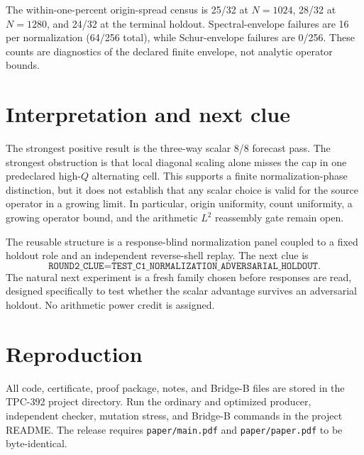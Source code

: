 \documentclass[10pt]{article}
\begin{document}
The within-one-percent origin-spread census is 25/32 at $N=1024$, 28/32 at
$N=1280$, and 24/32 at the terminal holdout.  Spectral-envelope failures are
16 per normalization (64/256 total), while Schur-envelope failures are 0/256.
These counts are diagnostics of the declared finite envelope, not analytic
operator bounds.

\section{Interpretation and next clue}

The strongest positive result is the three-way scalar 8/8 forecast pass.  The
strongest obstruction is that local diagonal scaling alone misses the cap in
one predeclared high-$Q$ alternating cell.  This supports a finite
normalization-phase distinction, but it does not establish that any scalar
choice is valid for the source operator in a growing limit.  In particular,
origin uniformity, count uniformity, a growing operator bound, and the
arithmetic $L^2$ reassembly gate remain open.

The reusable structure is a response-blind normalization panel coupled to a
fixed holdout role and an independent reverse-shell replay.  The next clue is
\[
 \texttt{ROUND2\_CLUE=TEST\_C1\_NORMALIZATION\_ADVERSARIAL\_HOLDOUT}.
\]
The natural next experiment is a fresh family chosen before responses are
read, designed specifically to test whether the scalar advantage survives an
adversarial holdout.  No arithmetic power credit is assigned.

\section*{Reproduction}

All code, certificate, proof package, notes, and Bridge-B files are stored in
the TPC-392 project directory.  Run the ordinary and optimized producer,
independent checker, mutation stress, and Bridge-B commands in the project
README.  The release requires
\texttt{paper/main.pdf} and \texttt{paper/paper.pdf} to be byte-identical.
\end{document}
